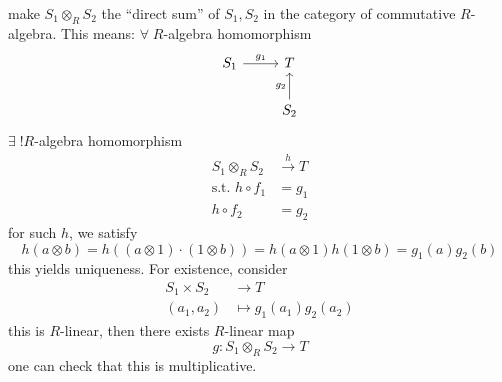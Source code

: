 make \( S_1\otimes_R S_2 \) the ``direct sum'' of \( S_1, S_2 \) in the category of commutative \( R \)-algebra. This means:
\( \forall \; R \)-algebra homomorphism
\[
	\begin{tikzcd}
		S_1 \arrow[r, "g_1"] & T \\
		& S_2 \arrow[u, "g_2"]
	\end{tikzcd}
\]
\( \exists \; ! R\)-algebra homomorphism
\[
	\begin{aligned}
		S_1 \otimes_R S_2       & \xrightarrow{h} T \\
		\text{s.t. } h\circ f_1 & = g_1             \\
		h \circ f_2             & = g_2
	\end{aligned}
\]
for such \( h \), we satisfy
\[
	h(a\otimes b) = h((a\otimes 1) \cdot (1\otimes b)) = h(a\otimes 1) h(1\otimes b) = g_1 (a) g_2(b)
\]
this yields uniqueness. For existence, consider
\[
	\begin{aligned}
		S_1 \times S_2 & \to T                     \\
		(a_1, a_2)     & \mapsto g_1(a_1) g_2(a_2)
	\end{aligned}
\]
this is \( R \)-linear, then there exists \( R \)-linear map
\[
	g: S_1 \otimes_R S_2 \to T
\]
one can check that this is multiplicative.

